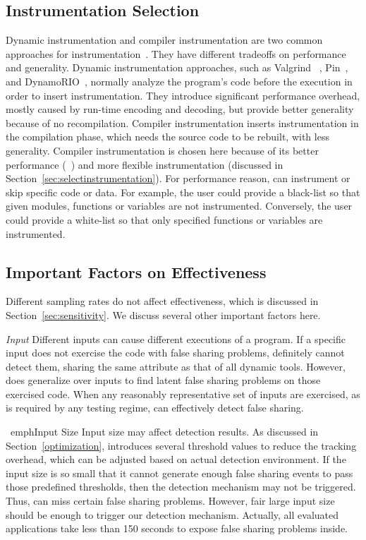 \label{sec:discussion}

\subsection{Instrumentation Selection}
\label{sec:instrumentationtradeoff}
Dynamic instrumentation and compiler instrumentation are two common approaches for instrumentation~\cite{Instrumentation}. They have different tradeoffs on performance and generality. Dynamic instrumentation approaches, such as Valgrind ~\cite{Valgrind}, Pin~\cite{Pin}, and DynamoRIO~\cite{DynamoRIO}, normally analyze the program's code before the execution in order to insert instrumentation. They introduce significant performance overhead, mostly caused by run-time encoding and decoding, but provide better generality because of no recompilation. Compiler instrumentation inserts instrumentation in the compilation phase, which needs the source code to be rebuilt, with less generality. 
Compiler instrumentation is chosen here because of its better performance (~\cite{Instrumentation}) and more flexible instrumentation (discussed in Section~\ref{sec:selectinstrumentation}). For performance reason, \Predator{} can instrument or skip specific code or data. For example, the user could provide a black-list so that given modules, functions or variables are not instrumented. Conversely, the user could provide a white-list so that only specified functions or variables are instrumented.

\subsection{Important Factors on Effectiveness}
Different sampling rates do not affect effectiveness, which is discussed in Section~\ref{sec:sensitivity}. We discuss several other important factors here. 

\emph{Input} Different inputs can cause different executions of a program. If a specific input does not exercise the code with false sharing problems, \Predator{} definitely cannot detect them, sharing the same attribute as that of all dynamic tools. However, \Predator{} does generalize over inputs to find latent false sharing problems on those exercised code. When any reasonably representative set of inputs are exercised, as is required by any testing regime, \Predator{} can effectively detect false sharing.

\ emph{Input Size} Input size may affect detection results.  As discussed in Section~\ref{optimization}, \Predator{} introduces several threshold values to reduce the tracking overhead, which can be adjusted based on actual detection environment. If the input size is so small that it cannot generate enough false sharing events to pass those predefined thresholds, then the detection mechanism may not be triggered. Thus, \Predator{} can miss certain false sharing problems. However, fair large input size should be enough to trigger our detection mechanism. Actually, all evaluated applications take less than 150 seconds to expose false sharing problems inside. 

